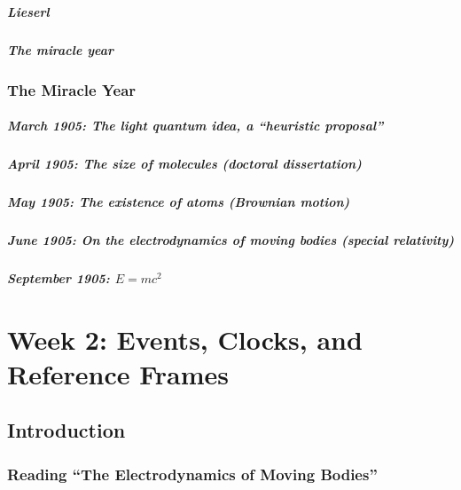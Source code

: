 \documentclass[pagesize,headsepline,10pt,parskip=half]{scrreprt}
\begin{document}
        \paragraph{Lieserl}
        \paragraph{The miracle year}

      \subsection{The Miracle Year}
        \paragraph{March 1905: The light quantum idea, a “heuristic proposal”}
        \paragraph{April 1905: The size of molecules (doctoral dissertation)}
        \paragraph{May 1905: The existence of atoms (Brownian motion)}
        \paragraph{June 1905: On the electrodynamics of moving bodies (special relativity)}
        \paragraph{September 1905: $E = mc^2$}

  \chapter{Week 2: Events, Clocks, and Reference Frames}
    \section{Introduction}
      \subsection{Reading “The Electrodynamics of Moving Bodies”}
\end{document}
